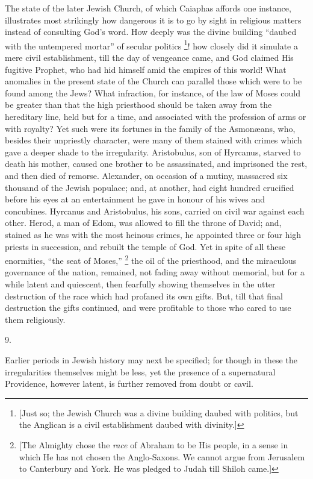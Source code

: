 The state of the later Jewish Church, of which Caiaphas affords one
instance, illustrates most strikingly how dangerous it is to go by
sight in religious matters instead of consulting God's word. How
deeply was the divine building ``daubed with the untempered
mortar'' of secular politics \footnote{[Just so; the Jewish Church was a divine
building daubed with politics, but the Anglican is a civil
establishment daubed with divinity.]}! how closely did it simulate a mere civil establishment, till
the day of vengeance came, and God claimed His fugitive Prophet,
who had hid himself amid the empires of this world! What anomalies in
the present state of the Church can parallel those which were to be
found among the Jews? What infraction, for instance, of the law of
Moses could be greater than that the high priesthood should be taken
away from the hereditary line, held but for a time, and associated
with the profession of arms or with royalty? Yet such were its
fortunes in the family of the Asmonæans, who, besides their
unpriestly character, were many of them stained with crimes which gave
a deeper shade to the irregularity. Aristobulus, son of Hyrcanus,
starved to death his mother, caused one brother to be assassinated,
and imprisoned the rest, and then died of remorse. Alexander, on
occasion of a mutiny, massacred six thousand of the Jewish populace;
and, at another, had eight hundred crucified before his eyes at an
entertainment he gave in honour of his wives and concubines. Hyrcanus
and Aristobulus, his sons, carried on civil war against each other.
Herod, a man of Edom, was allowed to fill the throne of David; and,
stained as he was with the most heinous crimes, he appointed three or
four high priests in succession, and rebuilt the temple of God. Yet in
spite of all these enormities, ``the seat of Moses,'' \footnote{[The Almighty chose the \emph{race} of
Abraham to be His people, in a sense in which He has not chosen the
Anglo-Saxons. We cannot argue from Jerusalem to Canterbury and York.
He was pledged to Judah till Shiloh came.]} the oil of the priesthood, and the miraculous governance of the
nation, remained, not fading away without memorial, but for a while
latent and quiescent, then fearfully showing themselves in the utter
destruction of the race which had profaned its own gifts. But, till
that final destruction the gifts continued, and were profitable to
those who cared to use them religiously.

9.

Earlier periods in Jewish history may next be specified; for though
in these the irregularities themselves might be less, yet the presence
of a supernatural Providence, however latent, is further removed from
doubt or cavil.

